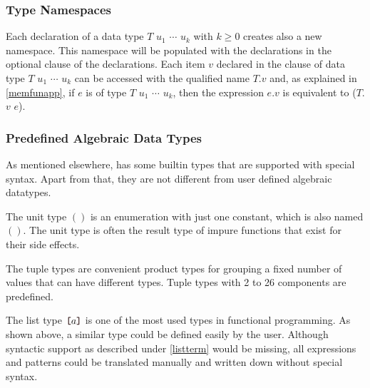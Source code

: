 \subsubsection{Type Namespaces}

Each declaration of a data type $T$ $u_1$ $\cdots$ $u_k$ with $k \ge 0$ creates also a new namespace. 
This namespace will be populated with the declarations in the optional  clause of the  declarations.
Each item $v$ declared in the  clause of data type $T$ $u_1$ $\cdots$ $u_k$  can be accessed with the qualified name $T$.$v$ and, 
as explained in \autoref{memfunapp}, 
if $e$ is of type $T$ $u_1$ $\cdots$ $u_k$, 
then the expression $e$.$v$ is equivalent to ($T$.$v$ $e$).

\subsubsection{Predefined Algebraic Data Types} \label{predef}

As mentioned elsewhere, \frege{} has some builtin types that are supported with special syntax. Apart from that, they are not different from user defined algebraic datatypes.

\label{unittype}
The unit type $()$ is an enumeration with just one constant, which is also named $()$. The unit type is often the result type of impure functions that exist for their side effects.

\label{tupletypes} 
The tuple types are convenient product types for grouping a fixed number of  values that can have different types. Tuple types with 2 to 26 components are predefined.

\label{listtype} 
The list type $\bracka{}a\brackz{}$ is one of the most used types in functional programming. As shown above, a similar type could be defined easily by the user. Although syntactic support as described under \autoref{listterm} would be missing, all expressions and patterns could be translated manually and written down without special syntax.


